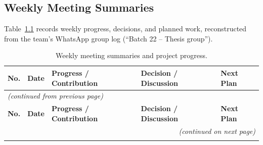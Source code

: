 \documentclass{iutbscthesis}
\begin{document}
\begin{appendices}

\chapter{Weekly Meeting Summaries}
Table~\ref{tab:weekly-summary} records weekly progress, decisions, and planned work, reconstructed from the team's WhatsApp group log (``Batch 22 -- Thesis group'').

\begingroup
\small
\begin{longtable}{@{}p{}p{}p{}p{}p{}@{}}
\caption{Weekly meeting summaries and project progress.} \label{tab:weekly-summary}\\
\hline
\textbf{No.} & \textbf{Date} & \textbf{Progress / Contribution} & \textbf{Decision / Discussion} & \textbf{Next Plan} \\
\hline
\endfirsthead

\multicolumn{5}{l}{\small\textit{(continued from previous page)}} \\
\hline
\textbf{No.} & \textbf{Date} & \textbf{Progress / Contribution} & \textbf{Decision / Discussion} & \textbf{Next Plan} \\
\hline
\endhead

\hline
\multicolumn{5}{r}{\small\textit{(continued on next page)}} \\
\endfoot

\hline
\endlastfoot


\end{longtable}
\end{appendices}
\end{document}
